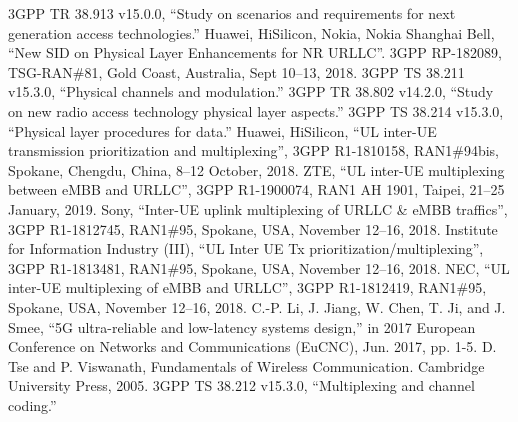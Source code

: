\documentclass[conference]{IEEEtran}
\begin{document}
\begin{thebibliography}{00}
 3GPP TR 38.913 v15.0.0, ``Study on scenarios and requirements for next generation access technologies.''
 Huawei, HiSilicon, Nokia, Nokia Shanghai Bell, ``New SID on Physical Layer Enhancements for NR URLLC''. 3GPP RP-182089, TSG-RAN\#81, Gold Coast, Australia, Sept 10--13, 2018.
 3GPP TS 38.211 v15.3.0, ``Physical channels and modulation.''
 3GPP TR 38.802 v14.2.0, ``Study on new radio access technology physical layer aspects.''
 3GPP TS 38.214 v15.3.0, ``Physical layer procedures for data.''
 Huawei, HiSilicon, ``UL inter-UE transmission prioritization and multiplexing'', 3GPP R1-1810158, RAN1\#94bis, Spokane, Chengdu, China, 8--12 October, 2018.
 ZTE, ``UL inter-UE multiplexing between eMBB and URLLC'', 3GPP R1-1900074, RAN1 AH 1901, Taipei,  21--25 January, 2019.
  Sony, ``Inter-UE uplink multiplexing of URLLC \& eMBB traffics'', 3GPP R1-1812745, RAN1\#95, Spokane, USA, November 12--16, 2018.
  Institute for Information Industry (III), ``UL Inter UE Tx prioritization/multiplexing'', 3GPP R1-1813481, RAN1\#95, Spokane, USA, November 12--16, 2018.
  NEC, ``UL inter-UE multiplexing of eMBB and URLLC'', 3GPP R1-1812419, RAN1\#95, Spokane, USA, November 12--16, 2018.
  C.-P. Li, J. Jiang, W. Chen, T. Ji, and J. Smee, ``5G ultra-reliable and low-latency systems design,'' in 2017 European Conference on Networks and Communications (EuCNC), Jun. 2017, pp. 1-5. 
 D. Tse and P. Viswanath, Fundamentals of Wireless Communication. Cambridge University Press, 2005. 
 3GPP TS 38.212 v15.3.0, ``Multiplexing and channel coding.''

\end{thebibliography}
\vspace{12pt}
\end{document}
